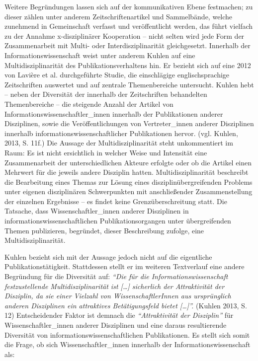 \documentclass[a4paper,
fontsize=11pt,
oneside,
numbers=noperiodatend,
parskip=half-,
bibliography=totoc,
final
]{scrartcl}
\begin{document}
Weitere Begründungen lassen sich auf der kommunikativen Ebene
festmachen; zu dieser zählen unter anderem Zeitschriftenartikel und
Sammelbände, welche zunehmend in Gemeinschaft verfasst und
veröffentlicht werden, das führt vielfach zu der Annahme x-disziplinärer
Kooperation -- nicht selten wird jede Form der Zusammenarbeit mit Multi-
oder Interdisziplinarität gleichgesetzt. Innerhalb der
Informationswissenschaft weist unter anderem Kuhlen auf eine
Multidisziplinarität des Publikationsverhaltens hin. Er bezieht sich auf
eine 2012 von Lavière et al. durchgeführte Studie, die einschlägige
englischsprachige Zeitschriften auswertet und auf zentrale
Themenbereiche untersucht. Kuhlen hebt -- neben der Diversität der
innerhalb der Zeitschriften behandelten Themenbereiche -- die steigende
Anzahl der Artikel von Informationswissenschaftler\_innen innerhalb der
Publikationen anderer Disziplinen, sowie die Veröffentlichungen von
Vertreter\_innen anderer Disziplinen innerhalb
informationswissenschaftlicher Publikationen hervor. (vgl. Kuhlen, 2013,
S. 11f.) Die Aussage der Multidisziplinarität steht unkommentiert im
Raum: Es ist nicht ersichtlich in welcher Weise und Intensität eine
Zusammenarbeit der unterschiedlichen Akteure erfolgte oder ob die
Artikel einen Mehrwert für die jeweils andere Disziplin hatten.
Multidisziplinarität beschreibt die Bearbeitung eines Themas zur Lösung
eines disziplinübergreifenden Problems unter eigenen disziplinären
Schwerpunkten mit anschließender Zusammenstellung der einzelnen
Ergebnisse -- es findet keine Grenzüberschreitung statt. Die Tatsache,
dass Wissenschaftler\_innen anderer Disziplinen in
informationswissenschaftlichen Publikationsorgangen unter übergreifenden
Themen publizieren, begründet, dieser Beschreibung zufolge, eine
Multidisziplinarität.

Kuhlen bezieht sich mit der Aussage jedoch nicht auf die eigentliche
Publikationstätigkeit. Stattdessen stellt er im weiteren Textverlauf
eine andere Begründung für die Diversität auf: \emph{\enquote{Die für
die Informationswissenschaft festzustellende Multidisziplinarität ist
{[}\ldots{}{]} sicherlich der Attraktivität der Disziplin, da sie einer
Vielzahl von WissenschaftlerInnen aus ursprünglich anderen Disziplinen
ein attraktives Betätigungsfeld bietet {[}\ldots{}{]}}.} (Kuhlen 2013,
S. 12) Entscheidender Faktor ist demnach die
\emph{\enquote{Attraktivität der Disziplin}} für Wissenschaftler\_innen
anderer Disziplinen und eine daraus resultierende Diversität von
informationswissenschaftlichen Publikationen. Es stellt sich somit die
Frage, ob sich Wissenschaftler\_innen innerhalb der
Informationswissenschaft als:
\end{document}
